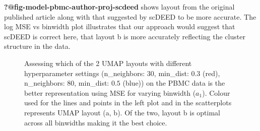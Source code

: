 \documentclass[
  12pt]{article}
\begin{document}
\textbf{?@fig-model-pbmc-author-proj-scdeed} shows layout from the
original published article along with that suggested by scDEED to be
more accurate. The log MSE vs binwidth plot illustrates that our
approach would suggest that scDEED is correct here, that layout b is
more accurately reflecting the cluster structure in the data.

\begin{figure}[H]


\caption{\label{fig-pbmc-mse-umap}Assessing which of the 2 UMAP layouts
with different hyperparameter settings (n\_neighbors: \(30\), min\_dist:
\(0.3\) (red), n\_neighbors: \(80\), min\_dist: \(0.5\) (blue)) on the
PBMC data is the better representation using MSE for varying binwidth
(\(a_1\)). Colour used for the lines and points in the left plot and in
the scatterplots represents UMAP layout (a, b). Of the two, layout b is
optimal across all binwidths making it the best choice.}

\end{figure}%


  
\end{document}
